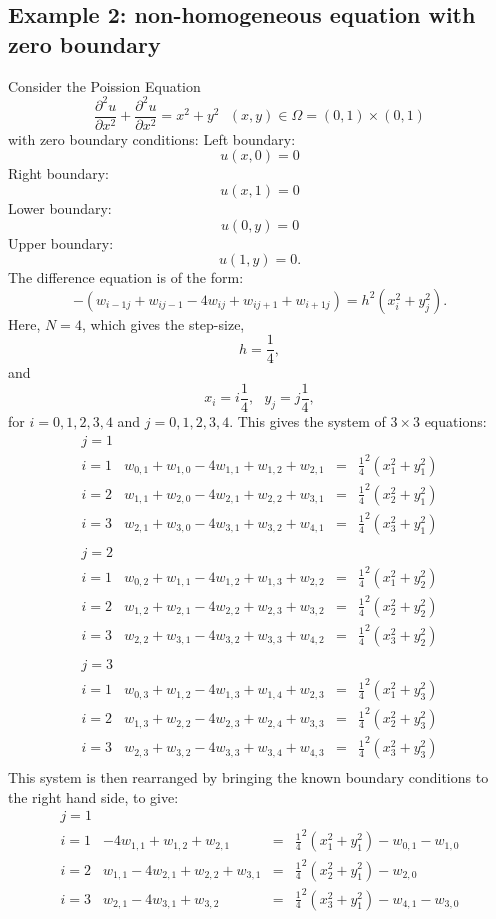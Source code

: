 \subsection{Example 2: non-homogeneous equation with zero boundary}
Consider the Poission Equation
\[ \frac{\partial^2 u}{\partial x^2}+\frac{\partial^2 u}{\partial x^2}=x^2+y^2 \ \ \ (x,y) \in \Omega=(0,1)\times (0,1) \]
with zero boundary conditions:
Left boundary:
\[u(x,0) =0 \]
Right boundary:
\[u(x,1) = 0  \]
Lower boundary:
\[u(0,y) = 0 \]
Upper boundary:
\[u(1,y) =  0. \]
The difference equation is of the form:
\[-(w_{i-1j}+w_{ij-1}-4w_{ij}+w_{ij+1}+w_{i+1j})=h^2(x_i^2+y_j^2). \]
Here, $N=4$, which gives the step-size,
\[h=\frac{1}{4},\]
and
\[x_i=i\frac{1}{4}, \ \ \ y_j=j\frac{1}{4},\]
for $i=0,1,2,3,4$ and $j=0,1,2,3,4$.
This gives the system of $3\times 3$ equations:
\[\begin{array}{l|rcl}
j=1\\
i=1&w_{0,1}+w_{1,0}-4w_{1,1}+w_{1,2}+w_{2,1}&=&\frac{1}{4}^2(x_1^2+y_1^2)\\
i=2&w_{1,1}+w_{2,0}-4w_{2,1}+w_{2,2}+w_{3,1}&=&\frac{1}{4}^2(x_2^2+y_1^2)\\
i=3&w_{2,1}+w_{3,0}-4w_{3,1}+w_{3,2}+w_{4,1}&=&\frac{1}{4}^2(x_3^2+y_1^2)\\
\end{array}
\]	
\[\begin{array}{l|rcl}
j=2\\
i=1&w_{0,2}+w_{1,1}-4w_{1,2}+w_{1,3}+w_{2,2}&=&\frac{1}{4}^2(x_1^2+y_2^2)\\
i=2&w_{1,2}+w_{2,1}-4w_{2,2}+w_{2,3}+w_{3,2}&=&\frac{1}{4}^2(x_2^2+y_2^2)\\
i=3&w_{2,2}+w_{3,1}-4w_{3,2}+w_{3,3}+w_{4,2}&=&\frac{1}{4}^2(x_3^2+y_2^2)\\
\end{array}
\]	
\[\begin{array}{l|rcl}
j=3\\
i=1&w_{0,3}+w_{1,2}-4w_{1,3}+w_{1,4}+w_{2,3}&=&\frac{1}{4}^2(x_1^2+y_3^2)\\
i=2&w_{1,3}+w_{2,2}-4w_{2,3}+w_{2,4}+w_{3,3}&=&\frac{1}{4}^2(x_2^2+y_3^2)\\
i=3&w_{2,3}+w_{3,2}-4w_{3,3}+w_{3,4}+w_{4,3}&=&\frac{1}{4}^2(x_3^2+y_3^2)\\
\end{array}
\]	
This  system  is  then  rearranged  by  bringing  the  known  boundary conditions to the right hand side, to give:
\[\begin{array}{l|rcl}

j=1\\
i=1&-4w_{1,1}+w_{1,2}+w_{2,1}&=&\frac{1}{4}^2(x_1^2+y_1^2)-w_{0,1}-w_{1,0}\\
i=2&w_{1,1}-4w_{2,1}+w_{2,2}+w_{3,1}&=&\frac{1}{4}^2(x_2^2+y_1^2)-w_{2,0}\\
i=3&w_{2,1}-4w_{3,1}+w_{3,2}&=&\frac{1}{4}^2(x_3^2+y_1^2)-w_{4,1}-w_{3,0}\\
\end{array}
\]	
